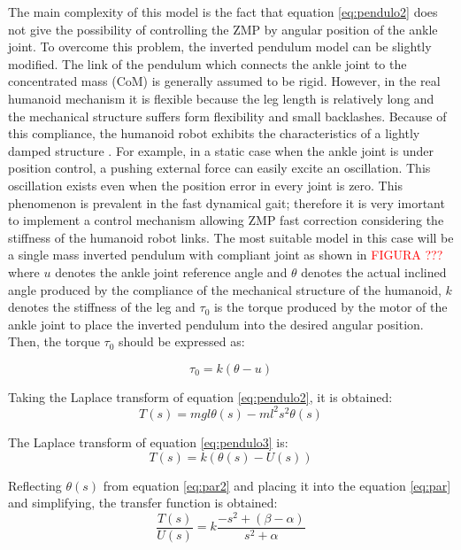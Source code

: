 The main complexity of this model is the fact that equation \ref{eq:pendulo2} does not give the possibility of controlling the ZMP by angular position of the ankle joint. To overcome this problem, the inverted pendulum model can be slightly modified. The link of the pendulum which connects the ankle joint to the concentrated mass (CoM) is generally assumed to be rigid. However, in the real humanoid mechanism it is flexible because the leg length is relatively long and the mechanical structure suffers form flexibility and small backlashes. Because of this compliance, the humanoid robot exhibits the characteristics of a lightly damped structure \cite{Kim2004}. For example, in a static case when the ankle joint is under position control, a pushing external force can easily excite an oscillation. This oscillation exists even when the position error in every joint is zero. This phenomenon is prevalent in the fast dynamical gait; therefore it is very imortant to implement a control mechanism allowing ZMP fast correction considering the stiffness of the humanoid robot links. The most suitable model in this case will be a single mass inverted pendulum with compliant joint as shown in \textcolor{red}{FIGURA ???} where $u$ denotes the ankle joint reference angle and $\theta$ denotes the actual inclined angle produced by the compliance of the mechanical structure of the humanoid, $k$ denotes the stiffness of the leg and $\tau_0$ is the torque produced by the motor of the ankle joint to place the inverted pendulum into the desired angular position. Then, the torque $\tau_0$ should be expressed as:

\begin{equation}
\tau_0 = k(\theta - u)
\label{eq:pendulo3}
\end{equation}

Taking the Laplace transform of equation \ref{eq:pendulo2}, it is obtained: 
\begin{equation}
T(s) = mgl\theta(s)- ml^2s^2\theta(s) 
\label{eq:par}
\end{equation}

The Laplace transform of equation \ref{eq:pendulo3} is:
\begin{equation}
T(s) = k(\theta(s) - U(s))
\label{eq:par2}
\end{equation}

Reflecting $\theta(s)$ from equation \ref{eq:par2} and placing it into the equation \ref{eq:par} and simplifying, the transfer function is obtained:
\begin{equation}
\frac{T(s)}{U(s)} = k \frac{-s^2+(\beta - \alpha)}{s^2 + \alpha}
\label{eq:TFpar}
\end{equation}

